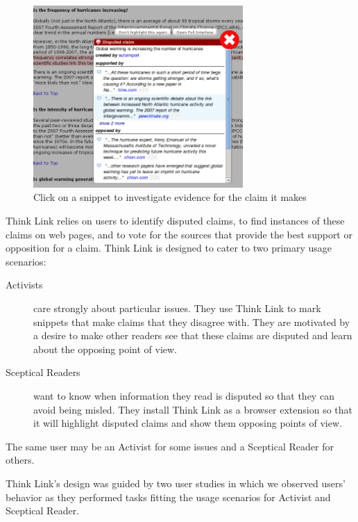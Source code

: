 \documentclass{chi2009}
\newcommand{\todo}[1]{}
\begin{document}
\begin{figure}[tb]
	\begin{center}
	\includegraphics[width=8cm]{../screenshots/v2_popup_dim2.png}
	\caption{Click on a snippet to investigate evidence for the claim it makes}
	\label{claimview}
	\end{center}
\end{figure}

Think Link relies on users to identify disputed claims, to find instances of these claims on web pages, and to vote for the sources that provide the best support or opposition for a claim. 
Think Link is designed to cater to two primary usage scenarios:

\begin{description}
\item[Activists] care strongly about particular issues. They use Think Link to mark snippets that make claims that they disagree with. They are motivated by a desire to make other readers see that these claims are disputed and learn about the opposing point of view.

\item[Sceptical Readers] want to know when information they read is disputed so that they can avoid being misled. They install Think Link as a browser extension so that it will highlight disputed claims and show them opposing points of view.
\end{description}

The same user may be an Activist for some issues and a Sceptical Reader for others.



\todo{Claim panel should have 'more' buttons}

Think Link's design was guided by two user studies in which we observed users' behavior as they performed tasks fitting the usage scenarios for Activist and Sceptical Reader.
\end{document}
